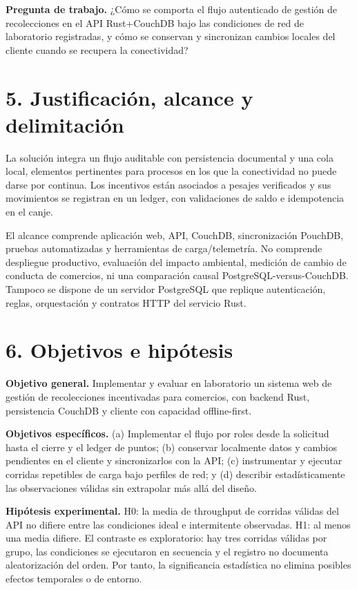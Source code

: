 \documentclass[
  spanish,
  12pt,
  a4paper,
]{article}
\begin{document}
\textbf{Pregunta de trabajo.} ¿Cómo se comporta el flujo autenticado de
gestión de recolecciones en el API Rust+CouchDB bajo las condiciones de
red de laboratorio registradas, y cómo se conservan y sincronizan
cambios locales del cliente cuando se recupera la conectividad?

\section{5. Justificación, alcance y
delimitación}\label{justificaciuxf3n-alcance-y-delimitaciuxf3n}

La solución integra un flujo auditable con persistencia documental y una
cola local, elementos pertinentes para procesos en los que la
conectividad no puede darse por continua. Los incentivos están asociados
a pesajes verificados y sus movimientos se registran en un ledger, con
validaciones de saldo e idempotencia en el canje.

El alcance comprende aplicación web, API, CouchDB, sincronización
PouchDB, pruebas automatizadas y herramientas de carga/telemetría. No
comprende despliegue productivo, evaluación del impacto ambiental,
medición de cambio de conducta de comercios, ni una comparación causal
PostgreSQL-versus-CouchDB. Tampoco se dispone de un servidor PostgreSQL
que replique autenticación, reglas, orquestación y contratos HTTP del
servicio Rust.

\section{6. Objetivos e hipótesis}\label{objetivos-e-hipuxf3tesis}

\textbf{Objetivo general.} Implementar y evaluar en laboratorio un
sistema web de gestión de recolecciones incentivadas para comercios, con
backend Rust, persistencia CouchDB y cliente con capacidad
offline-first.

\textbf{Objetivos específicos.} (a) Implementar el flujo por roles desde
la solicitud hasta el cierre y el ledger de puntos; (b) conservar
localmente datos y cambios pendientes en el cliente y sincronizarlos con
la API; (c) instrumentar y ejecutar corridas repetibles de carga bajo
perfiles de red; y (d) describir estadísticamente las observaciones
válidas sin extrapolar más allá del diseño.

\textbf{Hipótesis experimental.} H0: la media de throughput de corridas
válidas del API no difiere entre las condiciones ideal e intermitente
observadas. H1: al menos una media difiere. El contraste es
exploratorio: hay tres corridas válidas por grupo, las condiciones se
ejecutaron en secuencia y el registro no documenta aleatorización del
orden. Por tanto, la significancia estadística no elimina posibles
efectos temporales o de entorno.
\end{document}
